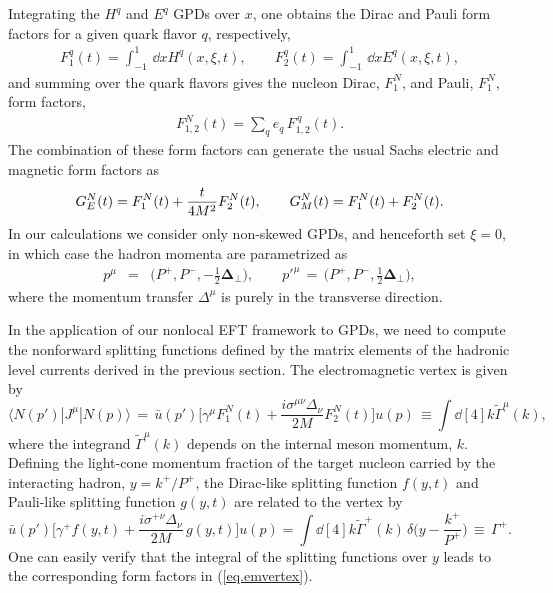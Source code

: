 \documentclass[preprintnumbers,prd,superscriptaddress,preprint]{revtex4-1}
\begin{document}
Integrating the $H^q$ and $E^q$ GPDs over $x$, one obtains the Dirac and Pauli form factors for a given quark flavor $q$, respectively,
%
\begin{eqnarray}
F_1^q(t) = \int_{-1}^1\,\dd{x} H^q(x,\xi,t), \qquad
F_2^q(t) = \int_{-1}^1\,\dd{x} E^q(x,\xi,t),
\label{eq.F12q}
\end{eqnarray}
%
and summing over the quark flavors gives the nucleon Dirac, $F_1^N$, and Pauli, $F_1^N$, form factors,
%
\begin{eqnarray}
F_{1,2}^N(t) = \sum_q e_q\, F_{1,2}^{\, q}(t).
\end{eqnarray}
%
The combination of these form factors can generate the usual Sachs electric and magnetic form factors as 
%
\begin{eqnarray}\label{EM}
G_E^N(t)=F_1^N(t)+{t\over{4M^2}}F_2^N(t), \qquad
G_M^N(t)=F_1^N(t)+F_2^N(t).
\label{eq.GEMN}
\end{eqnarray}
%
In our calculations we consider only non-skewed GPDs, and henceforth set $\xi=0$, in which case the hadron momenta are parametrized as~\cite{Brodsky:1997de}
%
\begin{eqnarray}
p^\mu   &=& \Big(P^+,P^-,-\frac12 {\bm \Delta_\perp}\Big), \qquad
p'^\mu\, =\, \Big(P^+,P^-,\frac12 {\bm \Delta_\perp}\Big),
\end{eqnarray}
%
where the momentum transfer $\Delta^\mu$ is purely in the transverse direction.

In the application of our nonlocal EFT framework to GPDs, we need to compute the nonforward splitting functions defined by the matrix elements of the hadronic level currents derived in the previous section.
The electromagnetic vertex is given by
%
\begin{equation}
\label{eq.emvertex}
\langle N(p')|J^{\mu}|N(p) \rangle\,
=\, \bar{u}(p')
    \Big[ \gamma^\mu F_1^N(t) + \frac{i\sigma^{\mu\nu}\Delta_\nu}{2M}F_2^N(t)
    \Big]
    u(p)\,
\equiv
\int\!\dd[4]{k} \widetilde{\Gamma}^\mu(k),
\end{equation}
%
where the integrand $\widetilde{\Gamma}^\mu (k)$ depends on the internal meson momentum, $k$.
%
Defining the light-cone momentum fraction of the target nucleon carried by the interacting hadron, $y = k^+/P^+$, the Dirac-like splitting function $f(y,t)$ and Pauli-like splitting function $g(y,t)$ are related to the vertex by
%
\begin{equation}
\bar{u}(p')
\Big[ \gamma^+ f(y,t) + \frac{i\sigma^{+\nu}\Delta_\nu}{2M}\, g(y,t)
\Big] 
u(p)
= \int \dd[4]{k} \widetilde{\Gamma}^+(k)\, \delta\Big(y-\frac{k^+}{P^+}\Big)\,
\equiv\, \Gamma^+.
\label{eq.Gamma+def}
\end{equation}
%
One can easily verify that the integral of the splitting functions over $y$ leads to the corresponding form factors in (\ref{eq.emvertex}).
\end{document}
